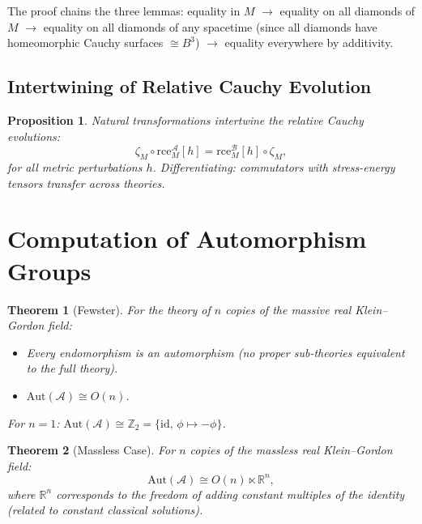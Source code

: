 \documentclass[11pt,a4paper]{article}
\newtheorem{theorem}{Theorem}[section]
\newtheorem{proposition}{Proposition}[section]
\begin{document}
The proof chains the three lemmas: equality in $M$ $\to$ equality on all
diamonds of $M$ $\to$ equality on all diamonds of any spacetime (since all
diamonds have homeomorphic Cauchy surfaces $\cong B^3$) $\to$ equality everywhere
by additivity.

\subsection{Intertwining of Relative Cauchy Evolution}

\begin{proposition}
Natural transformations intertwine the relative Cauchy evolutions:
\begin{equation}
  \zeta_M \circ \mathrm{rce}^{\mathscr{A}}_M[h] =
  \mathrm{rce}^{\mathscr{B}}_M[h] \circ \zeta_M,
\end{equation}
for all metric perturbations $h$. Differentiating: commutators with
stress-energy tensors transfer across theories.
\end{proposition}

\section{Computation of Automorphism Groups}

\begin{theorem}[Fewster]
For the theory of $n$ copies of the massive real Klein--Gordon field:
\begin{itemize}[nosep]
  \item Every endomorphism is an automorphism (no proper sub-theories equivalent
        to the full theory).
  \item $\mathrm{Aut}(\mathscr{A}) \cong O(n)$.
\end{itemize}
For $n=1$: $\mathrm{Aut}(\mathscr{A}) \cong \mathbb{Z}_2 = \{\mathrm{id},\, \phi \mapsto -\phi\}$.
\end{theorem}

\begin{theorem}[Massless Case]
For $n$ copies of the massless real Klein--Gordon field:
\begin{equation}
  \mathrm{Aut}(\mathscr{A}) \cong O(n) \ltimes \mathbb{R}^n,
\end{equation}
where $\mathbb{R}^n$ corresponds to the freedom of adding constant
multiples of the identity (related to constant classical solutions).
\end{theorem}
\end{document}
